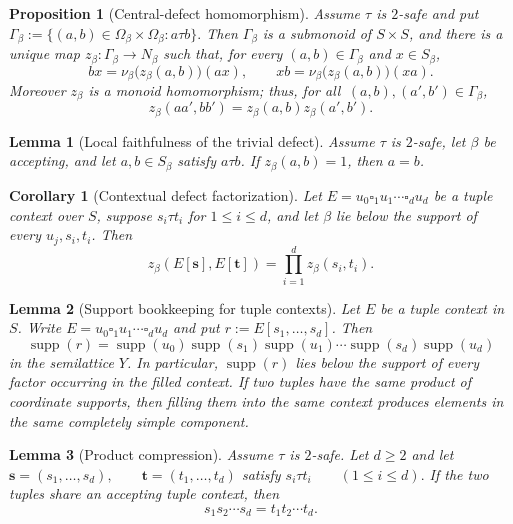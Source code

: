 \documentclass[10pt,a4paper]{amsart}
\newtheorem{proposition}{Proposition}
\newtheorem{lemma}{Lemma}
\newtheorem{corollary}{Corollary}
\newcommand{\blank}{\square}
\begin{document}
\begin{proposition}[Central-defect homomorphism]
\label{cr:lem:uniform-defect}
Assume \(\tau\) is \(2\)-safe and put
\(\Gamma_\beta:=\{(a,b)\in\Omega_\beta\times\Omega_\beta:a\tau b\}.\)
Then \(\Gamma_\beta\) is a submonoid of \(S\times S\), and there is a unique
map \(z_\beta:\Gamma_\beta\to N_\beta\) such that, for every
\((a,b)\in\Gamma_\beta\) and \(x\in S_\beta\),
\[
bx=\nu_\beta\bigl(z_\beta(a,b)\bigr)(ax),
\qquad
xb=\nu_\beta\bigl(z_\beta(a,b)\bigr)(xa).
\tag{UD}
\]
Moreover \(z_\beta\) is a monoid homomorphism; thus, for all
$\,(a,b),(a',b')\in\Gamma_\beta$,
\begin{equation}
z_\beta(aa',bb')=z_\beta(a,b)z_\beta(a',b').
\label{eq:cr-defect-homomorphism}
\end{equation}
\end{proposition}

\begin{lemma}[Local faithfulness of the trivial defect]
\label{cr:lem:local-faithfulness}
Assume \(\tau\) is \(2\)-safe, let \(\beta\) be accepting, and let
\(a,b\in S_\beta\) satisfy \(a\tau b\).  If \(z_\beta(a,b)=1\), then
\(a=b\).
\end{lemma}

\begin{corollary}[Contextual defect factorization]
\label{cr:cor:context-defect}
Let \(E=u_0\blank_1u_1\cdots\blank_du_d\) be a tuple context over \(S\),
suppose \(s_i\tau t_i\) for \(1\le i\le d\), and let \(\beta\) lie below
the support of every \(u_j,s_i,t_i\).  Then
\[
z_\beta(E[\mathbf s],E[\mathbf t])
=\prod_{i=1}^d z_\beta(s_i,t_i).
\tag{CD}
\]
\end{corollary}

\begin{lemma}[Support bookkeeping for tuple contexts]
\label{cr:lem:support-bookkeeping}
Let \(E\) be a tuple context in \(S\).  Write
\(E=u_0\blank_1u_1\cdots\blank_du_d\) and put \(r:=E[s_1,\ldots,s_d]\). Then
\[
\operatorname{supp}(r)
=\operatorname{supp}(u_0)\operatorname{supp}(s_1)\operatorname{supp}(u_1)\cdots
\operatorname{supp}(s_d)\operatorname{supp}(u_d)
\]
in the semilattice \(Y\). In particular,
\(\operatorname{supp}(r)\) lies below the support of every factor occurring
in the filled context. If two tuples have the same product of coordinate
supports, then filling them into the same context produces elements in the
same completely simple component.
\end{lemma}

\begin{lemma}[Product compression]
\label{cr:lem:product-compression}
Assume $\tau$ is $2$-safe.  Let $d\ge2$ and let
\(\mathbf s=(s_1,\ldots,s_d), \qquad \mathbf t=(t_1,\ldots,t_d)\)
satisfy
\(s_i\tau t_i \qquad(1\le i\le d).\)
If the two tuples share an accepting tuple context, then
\begin{equation}
s_1s_2\cdots s_d
=
t_1t_2\cdots t_d.
\label{eq:cr-product-compression}
\end{equation}
\end{lemma}
\end{document}
